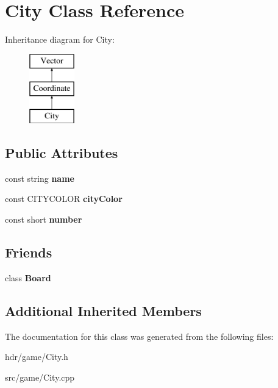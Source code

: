 \section{City Class Reference}
\label{class_city}
Inheritance diagram for City\-:\begin{figure}[H]
\begin{center}
\leavevmode
\includegraphics[height=3.000000cm]{class_city}
\end{center}
\end{figure}
\subsection*{Public Attributes}
\begin{DoxyCompactItemize}
\item 
const string {\bfseries name}\label{class_city_a310190e6982fe11505a1843f25a574c1}

\item 
const C\-I\-T\-Y\-C\-O\-L\-O\-R {\bfseries city\-Color}\label{class_city_abae5ba345916c1d8723ee5df4dc2971a}

\item 
const short {\bfseries number}\label{class_city_aec8810e4fa1fabf64ce809175d1d6362}

\end{DoxyCompactItemize}
\subsection*{Friends}
\begin{DoxyCompactItemize}
\item 
class {\bfseries Board}\label{class_city_a12525b6ed7c8186be0bee5cf78e2a49c}

\end{DoxyCompactItemize}
\subsection*{Additional Inherited Members}


The documentation for this class was generated from the following files\-:\begin{DoxyCompactItemize}
\item 
hdr/game/City.\-h\item 
src/game/City.\-cpp\end{DoxyCompactItemize}
